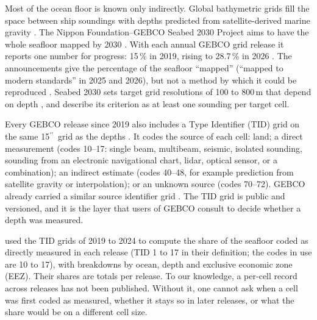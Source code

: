 \documentclass[essd, manuscript]{copernicus}
\newcommand{\as}{$^{\prime\prime}$}      %
\renewcommand{\_}{\usorig\allowbreak}
\begin{document}
\introduction

Most of the ocean floor is known only indirectly.
Global bathymetric grids fill the space between ship soundings with depths predicted from satellite-derived marine gravity \citep{smith1997,tozer2019}.
The Nippon Foundation--GEBCO Seabed 2030 Project aims to have the whole seafloor mapped by 2030 \citep{mayer2018,wolfl2019}.
With each annual GEBCO grid release it reports one number for progress: 15\,\% in 2019, rising to 28.7\,\% in 2026 \citep{news2019,news2026}.
The announcements give the percentage of the seafloor ``mapped'' (``mapped to modern standards'' in 2025 and 2026), but not a method by which it could be reproduced \citep{news2025,news2026}.
Seabed 2030 sets target grid resolutions of 100 to 800\,m that depend on depth \citep[Table~2]{mayer2018}, and \citet{niyazi2025} describe its criterion as at least one sounding per target cell.

Every GEBCO release since 2019 also includes a Type Identifier (TID) grid on the same 15\as\ grid as the depths \citep{gebcodoc2026}.
It codes the source of each cell: land; a direct measurement (codes 10--17: single beam, multibeam, seismic, isolated sounding, sounding from an electronic navigational chart, lidar, optical sensor, or a combination); an indirect estimate (codes 40--48, for example prediction from satellite gravity or interpolation); or an unknown source (codes 70--72).
GEBCO\_2014 already carried a similar source identifier grid \citep{weatherall2015}.
The TID grid is public and versioned, and it is the layer that users of GEBCO consult to decide whether a depth was measured.

\citet{niyazi2025} used the TID grids of 2019 to 2024 to compute the share of the seafloor coded as directly measured in each release (TID 1 to 17 in their definition; the codes in use are 10 to 17), with breakdowns by ocean, depth and exclusive economic zone (EEZ).
Their shares are totals per release.
To our knowledge, a per-cell record across releases has not been published.
Without it, one cannot ask when a cell was first coded as measured, whether it stays so in later releases, or what the share would be on a different cell size.
\end{document}
